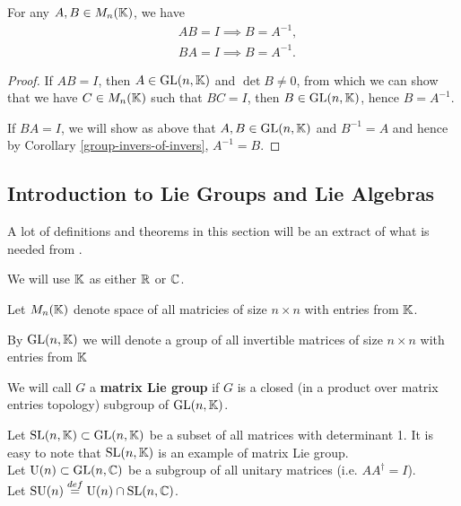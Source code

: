 \documentclass[main.tex]{subfiles}
\begin{document}
\begin{proposition}
For any $A, B \in  M_n(\mathbb{K})$, we have
\begin{align}
& AB = I \implies B = A^{-1},\\
& BA = I \implies B = A^{-1}.
\end{align} 
\end{proposition}
\begin{proof}
If $AB = I$, then $A\in \text{GL}(n, \mathbb{K})$ and $\det B \not = 0$, from which we can show that we have $C\in  M_n(\mathbb{K})$ such that $BC = I$, then $B\in \text{GL}(n, \mathbb{K})$, hence $B = A^{-1}$.

If $BA = I$, we will show as above that $A, B\in \text{GL}(n, \mathbb{K})$ and $B^{-1} = A$ and hence by Corollary \ref{group-invers-of-invers}, $A^{-1} = B$.
\end{proof}



\subsection{Introduction to Lie Groups and Lie Algebras}

A lot of definitions and theorems in this section will be an extract of what is needed from \cite{hall2015}.

We will use $\mathbb{K}$ as either $\mathbb{R}$ or $\mathbb{C}$.

Let $M_n(\mathbb{K})$ denote space of all matricies of size $n\times n$ with entries from $\mathbb{K}$.

By $\text{GL}(n, \mathbb{K})$ we will denote a group of all invertible matrices of size $n\times n$ with entries from $\mathbb{K}$


\begin{definition}
We will call $G$ a \textbf{matrix Lie group} if $G$ is a closed (in a product over matrix entries topology) subgroup of $\text{GL}(n, \mathbb{K})$.
\end{definition}

Let $\text{SL}(n, \mathbb{K}) \subset \text{GL}(n, \mathbb{K})$ be a subset of all matrices with determinant 1. It is easy to note that $\text{SL}(n, \mathbb{K})$ is an example of matrix Lie group.\\

Let $\text{U}(n)\subset \text{GL}(n, \mathbb{C})$ be a subgroup of all unitary matrices (i.e. $AA^\dagger = I$).\\

Let $\text{SU}(n) \stackrel{def}{=}  \text{U}(n) \cap \text{SL}(n, \mathbb{C})$.\\
\end{document}
